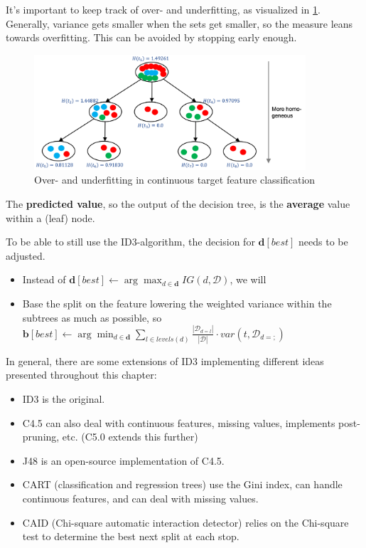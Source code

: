 It's important to keep track of over- and underfitting, as visualized in \ref{fig:3_overunder_target}. Generally, variance gets smaller when the sets get smaller, so the measure leans towards overfitting. This can be avoided by stopping early enough.

\begin{figure}[h]
  \centering
  \includegraphics[width=0.9\textwidth]{assets/trees/cont/target_overunder.png}
  \caption{Over- and underfitting in continuous target feature classification}
  \label{fig:3_overunder_target}
\end{figure}

The \textbf{predicted value}, so the output of the decision tree, is the \textbf{average} value within a (leaf) node.


To be able to still use the ID3-algorithm, the decision for $\mathbf{d}[best]$ needs to be adjusted.
\begin{itemize}
  \item Instead of $\mathbf{d}[best] \leftarrow \arg\max_{d\in\mathbf{d}} IG(d, \mathcal{D})$, we will
  \item Base the split on the feature lowering the weighted variance within the subtrees as much as possible, so $\mathbf{b}[best] \leftarrow \arg\min_{d\in\mathbf{d}}\sum_{l\in levels(d)}\frac{|\mathcal{D}_{d=l}|}{|\mathcal{D}|}\cdot var(t, \mathcal{D}_{d=;})$
\end{itemize}
In general, there are some extensions of ID3 implementing different ideas presented throughout this chapter:
\begin{itemize}
  \item ID3 is the original.
  \item C4.5 can also deal with continuous features, missing values, implements post-pruning, etc. (C5.0 extends this further)
  \item J48 is an open-source implementation of C4.5.
  \item CART (classification and regression trees) use the Gini index, can handle continuous features, and can deal with missing values.
  \item CAID (Chi-square automatic interaction detector) relies on the Chi-square test to determine the best next split at each stop.
\end{itemize}


